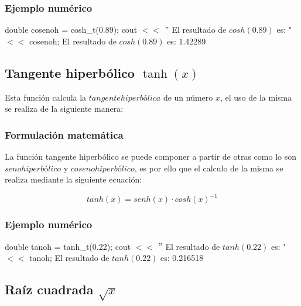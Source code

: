 \documentclass[10pt,a4paper]{article}
\begin{document}
	\subsubsection{Ejemplo numérico}
	
	double cosenoh = cosh{\_}t(0.89); \newline
	cout $<<$ $"$ El resultado de $cosh(0.89)$ es: " $<<$ cosenoh; \newline
	El resultado de $cosh(0.89)$ es: 1.42289\newline

	\subsection{Tangente hiperbólico $\tanh(x)$}
	
	Esta función calcula la $tangente hiperbólica$ de un número $x$, el uso de la misma se realiza de la siguiente manera:
	
	\begin{center}
	\end{center}
	
	\subsubsection{Formulación matemática}
	
	La función tangente hiperbólico se puede componer a partir de otras como lo son $seno hiperbólico$ y $coseno hiperbólico$, es por ello que el calculo de la misma se realiza mediante la siguiente ecuación:
	
	\begin{equation}\label{key18}
		tanh(x) = senh(x)\cdot cosh(x)^{-1}
	\end{equation}
	
	\subsubsection{Ejemplo numérico}

	double tanoh = tanh{\_}t(0.22); \newline
	cout $<<$ $"$ El resultado de $tanh(0.22)$ es: " $<<$ tanoh; \newline
	El resultado de $tanh(0.22)$ es: 0.216518\newline
	
	\subsection{Raíz cuadrada $\sqrt{x}$}
	
\end{document}

